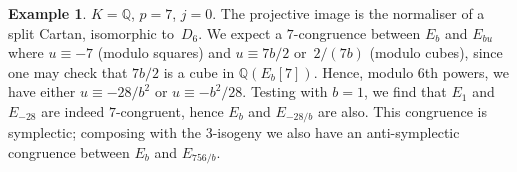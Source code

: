 \documentclass[12pt, reqno]{amsart}
\newcommand{\Q}{\mathbb{Q}}
\newcommand{\Z}{\mathbb{Z}}
\newcommand{\calO}{\mathcal{O}}
\def\w{\omega}
\def\r3{\sqrt{-3}}
\def\pibar{\overline{\pi}}
\numberwithin{equation}{section}
\newtheorem{theorem}{Theorem}[section]
\theoremstyle{definition}
\newtheorem{example}[theorem]{Example}
\theoremstyle{remark}
\begin{document}
\begin{example}
$K=\Q$, $p=7$, $j=0$.  The projective image is the normaliser of a
  split Cartan, isomorphic to~$D_6$.  We expect a $7$-congruence
  between $E_b$ and $E_{bu}$ where $u\equiv-7$ (modulo squares) and
  $u\equiv 7b/2$ or~$2/(7b)$ (modulo cubes), since one may check that
  $7b/2$ is a cube in $\Q(E_b[7])$.  Hence, modulo $6$th powers, we
  have either $u\equiv -28/b^2$ or $u\equiv -b^2/28$.  Testing with
  $b=1$, we find that $E_1$ and $E_{-28}$ are indeed $7$-congruent,
  hence $E_b$ and $E_{-28/b}$ are also.  This congruence is
  symplectic; composing with the $3$-isogeny we also have an
  anti-symplectic congruence between $E_b$ and $E_{756/b}$.
\end{example}

\begin{comment}
\subsection{[Old version] Mod $7$ isomorphisms between elliptic curves with
  $j$-invariant~$0$}

For curves with $j$-invariant~$0$ we only consider the prime~$p=7$,
and the base field~$\Q$.  Little change would be required in what
follows if $\Q$ were to be replaced by any field of characteristic
different from~$2$, $3$ or $7$ in which $-3$ is not a square.  In case
$-3$ is a square there is some simplification, and a similar result
holds.

We will show that for every elliptic curve~$E/\Q$ with $j(E)=0$, there
are three non-trivial sextic twists of~$E$ with isomorphic mod-$7$
Galois representations, one symplectic and two anti-symplectic.

Recall that every elliptic curve with $j=0$ has a model of the form
$E_b:\ Y^2=X^3+b$ with $b$ nonzero, and the isomorphism class of $E_b$
depends only on $b$ modulo $6$th powers.  Any two such curves are
sextic twists of each other: the sextic twist of $E_b$ by $u$ is
$E_{bu}$, which is isomorphic to $E_b$ if and only if $u$ is a $6$th
power.  We will prove the following:

\begin{theorem}\label{T:j=0-old}
For all $b \in \Q^*$, the elliptic curves $E_b$ and $E_{-28/b}$ have
symplectically isomorphic mod-$7$ Galois representations.
\end{theorem}

\begin{proof}
We fix some notation. Let $K=\Q(\r3)=\Q(\w)$ where $\w$ satisfies
$\w^2+\w+1=0$, so that $\w$ is a primitive $3$rd root of
unity and $-\w$ a primitive $6$th root of unity.  The
curves $E_b$ have CM by the maximal order~$\calO_K=\Z[\w]$ in which
$7$ splits as $7=\pi\pibar$ where $\pi=3\w+2$.  Set
$\r3=2w+1$ (to fix the sign).  We denote the nontrivial
automorphism of $K/\Q$ by $x\mapsto x'$.


\end{comment}
\end{document}
